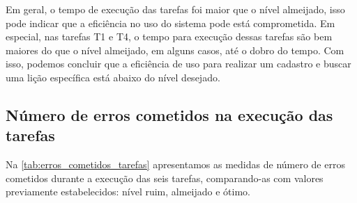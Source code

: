 Em geral, o tempo de execução das tarefas foi maior que o nível almeijado, isso pode indicar que a eficiência no uso do sistema pode está comprometida. Em especial, nas tarefas T1 e T4, o tempo para execução dessas tarefas são bem maiores do que o nível almeijado, em alguns casos, até o dobro do tempo. Com isso, podemos concluir que a eficiência de uso para realizar um cadastro e buscar uma lição específica está abaixo do nível desejado.  

\subsection{Número de erros cometidos na execução das tarefas}
Na \autoref{tab:erros_cometidos_tarefas} apresentamos as medidas de número de erros cometidos durante a execução das seis tarefas, comparando-as com valores previamente estabelecidos: nível ruim, almeijado e ótimo. 

\begin{table}[H]
\end{table}

